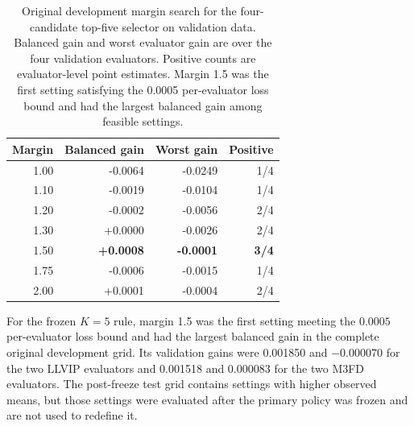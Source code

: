 \documentclass[11pt]{article}
\begin{document}
\begin{table}[ht]
\centering
\small
\caption{Original development margin search for the four-candidate top-five
selector on validation data. Balanced gain and worst evaluator gain are over
the four validation evaluators. Positive counts are evaluator-level point
estimates. Margin 1.5 was the first setting satisfying the 0.0005 per-evaluator
loss bound and had the largest balanced gain among feasible settings.}
\label{tab:prefreeze-validation}
\begin{tabular}{@{}rrrr@{}}
\toprule
Margin & Balanced gain & Worst gain & Positive \\
\midrule
1.00 & -0.0064 & -0.0249 & 1/4 \\
1.10 & -0.0019 & -0.0104 & 1/4 \\
1.20 & -0.0002 & -0.0056 & 2/4 \\
1.30 & +0.0000 & -0.0026 & 2/4 \\
1.50 & \textbf{+0.0008} & \textbf{-0.0001} & \textbf{3/4} \\
1.75 & -0.0006 & -0.0015 & 1/4 \\
2.00 & +0.0001 & -0.0004 & 2/4 \\
\bottomrule
\end{tabular}
\end{table}

For the frozen \(K=5\) rule, margin 1.5 was the first setting meeting the
\(0.0005\) per-evaluator loss bound and had the largest balanced gain in the
complete original development grid. Its validation gains were 0.001850 and \(-0.000070\)
for the two LLVIP evaluators and 0.001518 and 0.000083 for the two M3FD
evaluators. The post-freeze test grid contains settings with higher observed
means, but those settings were evaluated after the primary policy was frozen
and are not used to redefine it.
\end{document}
